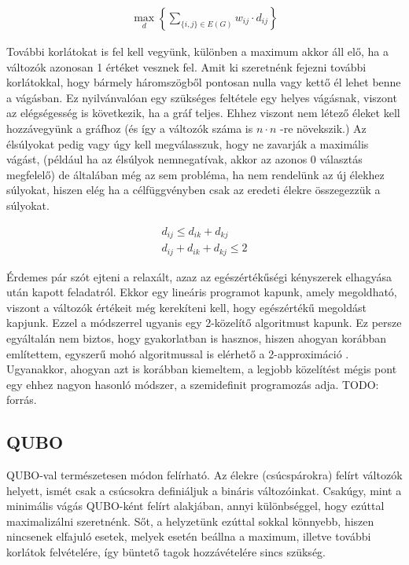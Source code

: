 \begin{align}
	\max_{d} \left\{ \sum_{\{i,j\}\in E(G)}{w_{ij}\cdot d_{ij}}\right\}
\end{align}

További korlátokat is fel kell vegyünk, különben a maximum akkor áll elő, ha a változók azonosan 1 értéket vesznek fel.
Amit ki szeretnénk fejezni további korlátokkal, hogy bármely háromszögből pontosan nulla vagy kettő él lehet benne a vágásban. Ez nyilvánvalóan egy szükséges feltétele egy helyes vágásnak, viszont az elégségesség is következik, ha a gráf teljes. Ehhez viszont nem létező éleket kell hozzávegyünk a gráfhoz (és így a változók száma is $n \cdot n$ -re növekszik.) Az élsúlyokat pedig vagy úgy kell megválasszuk, hogy ne zavarják a maximális vágást, (például ha az élsúlyok nemnegatívak, akkor az azonos 0 választás megfelelő) de általában még az sem probléma, ha nem rendelünk az új élekhez súlyokat, hiszen elég ha a célfüggvényben csak az eredeti élekre összegezzük a súlyokat.

\begin{align}
 d_{ij} \leq d_{ik}+d_{kj}  \\
 d_{ij}+d_{ik}+d_{kj} \leq 2  
\end{align}

Érdemes pár szót ejteni a relaxált, azaz az egészértékűségi kényszerek elhagyása után kapott feladatról. Ekkor egy lineáris programot kapunk, amely megoldható, viszont a változók értékeit még kerekíteni kell, hogy egészértékű megoldást kapjunk. Ezzel a módszerrel ugyanis egy 2-közelítő algoritmust kapunk. Ez persze egyáltalán nem biztos, hogy gyakorlatban is hasznos, hiszen ahogyan korábban említettem, egyszerű mohó algoritmussal is elérhető a 2-approximáció \cite{10.5555/1283383.1283390, POLJAK1994191}.
Ugyanakkor, ahogyan azt is korábban kiemeltem, a legjobb közelítést mégis pont egy ehhez nagyon hasonló módszer, a szemidefinit programozás adja. TODO: forrás.


\subsection{QUBO}

QUBO-val természetesen módon felírható. Az élekre (csúcspárokra) felírt változók helyett, ismét csak a csúcsokra definiáljuk a bináris változóinkat. Csakúgy, mint a minimális vágás QUBO-ként felírt alakjában, annyi különbséggel, hogy ezúttal maximalizálni szeretnénk. Sőt, a helyzetünk ezúttal sokkal könnyebb, hiszen nincsenek elfajuló esetek, melyek esetén beállna a maximum, illetve további korlátok felvételére, így büntető tagok hozzávételére sincs szükség.

